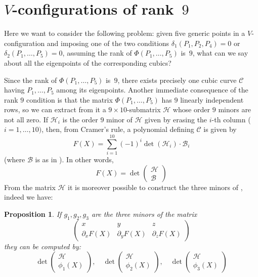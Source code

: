 \documentclass{amsart}
\theoremstyle{plain}
\newtheorem{prop}[lemma]{Proposition}
\theoremstyle{definition}
\newcommand{\de}{\partial}
\newcommand{\cbc}{\ensuremath{\mathcal{C}}}
\begin{document}
\section{$V$-configurations of rank~$9$}
\label{rank_9}

Here we want to consider the following problem:
given five generic points in a $V$-configuration and imposing one
of the two conditions
$\delta_1(P_1, P_2, P_4) = 0$ or $\delta_2(P_1, \dots, P_5) = 0$, assuming the rank of $\Phi(P_1, \dots, P_5)$ is~$9$, what can we say about all the eigenpoints of the corresponding cubics?

Since the rank of $\Phi(P_1, \dots, P_5)$ is~$9$, there exists precisely one cubic curve $\cbc$ having $P_1, \dots, P_5$ among its eigenpoints. Another immediate consequence of the rank $9$ condition is that the
matrix $\Phi(P_1, \dots, P_5)$ has $9$ linearly independent rows, so
we can extract from it a  $9 \times 10$-submatrix
$\mathcal{H}$ whose order $9$ minors are not all zero. If
$\mathcal{H}_i$ is the order $9$ minor of
$\mathcal{H}$ given by erasing the $i$-th column ($i=1, \dots, 10)$, then,
from Cramer's rule, a polynomial defining $\cbc$ is given by
\[
 F(X) = \sum_{i=1}^{10}(-1)^i\det(\mathcal{H}_i)\cdot \mathcal{B}_i
\]
(where $\mathcal{B}$ is as in ). In other words,
\[
F(X) = \det \left( \begin{array}{c} \mathcal{H}\\ \mathcal{B}
 \end{array} \right)
\]
From the matrix $\mathcal{H}$ it is moreover possible to construct
the three minors of , indeed we have:
\begin{prop}
\label{proposition:geiser1}
If $g_1, g_2, g_3$ are the three minors of the matrix
\[
\left(
\begin{array}{ccc}
x & y & z \\
\de_xF(X) & \de_yF(X) & \de_z F(X)
\end{array}
\right)
\]
they can be computed by:
\[
\det \left( \begin{array}{c} \mathcal{H}\\
\phi_1(X)
\end{array} \right),\quad
\det \left( \begin{array}{c} \mathcal{H}\\
\phi_2(X)
\end{array} \right), \quad
\det \left( \begin{array}{c} \mathcal{H}\\
\phi_3(X)
\end{array} \right)
\]
\end{prop}
\end{document}
